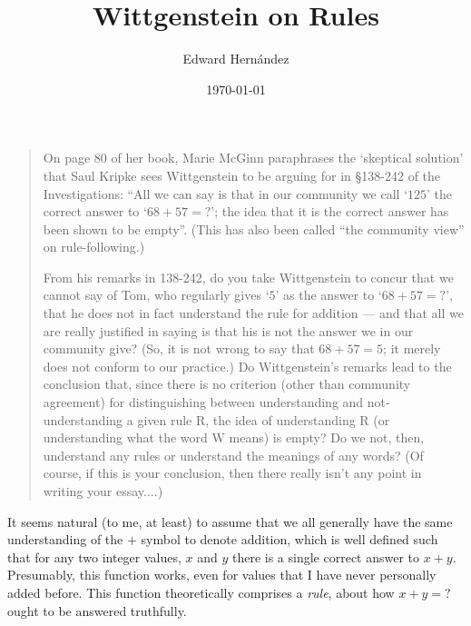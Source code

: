 \documentclass[doc,12pt,apacite,biblatex]{apa6}
\begin{document}
 \title{Wittgenstein on Rules}
\author{Edward Hern\'{a}ndez}
\date{\today}

\maketitle

\vspace{-20pt}
\begin{quote}
	On page 80 of her book, Marie McGinn paraphrases the `skeptical solution'
	that Saul Kripke sees Wittgenstein to be arguing for in \S 138-242 of the
	Investigations: ``All we can say is that in our community we call `$125$'
	the correct answer to `$68 + 57 = ?$'; the idea that it is the correct
	answer has been shown to be empty''. (This has also been called ``the
	community view'' on rule-following.)
	
	From his remarks in 138-242, do you take Wittgenstein to concur that we
	cannot say of Tom, who regularly gives `$5$' as the answer to `$68 + 57 =
	?$', that he does not in fact understand the rule for addition --- and that
	all we are really justified in saying is that his is not the answer we in
	our community give?  (So, it is not wrong to say that $68 + 57 = 5$; it
	merely does not conform to our practice.)  Do Wittgenstein's remarks lead
	to the conclusion that, since there is no criterion (other than community
	agreement) for distinguishing between understanding and not-understanding a
	given rule R, the idea of understanding R (or understanding what the word W
	means) is empty?  Do we not, then, understand any rules or understand the
	meanings of any words?  (Of course, if this is your conclusion, then there
	really isn't any point in writing your essay....)
\end{quote}
\clearpage

It seems natural (to me, at least) to assume that we all generally have the same understanding of the $+$ symbol to denote addition, which is well defined such that for any two integer values, $x$ and $y$ there is a single correct answer to $x + y$. Presumably, this function works, even for values that I have never personally added before. This function theoretically comprises a \emph{rule}, about how $x + y = ?$ ought to be answered truthfully.
\end{document}
